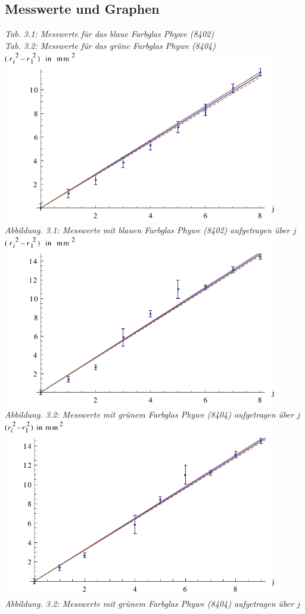 \subsection{Messwerte und Graphen}
\begin{center}

{\it Tab. 3.1: Messwerte für das blaue Farbglas Phywe (8402)}
\vspace{5mm}
\\

{\it Tab. 3.2: Messwerte für das grüne Farbglas Phywe (8404)}
\\
\includegraphics[width=12cm]{graphen/blau}
{\it Abbildung. 3.1: Messwerte mit blauen Farbglas Phywe (8402) aufgetragen über \(j\)}
\\
\includegraphics[width=12cm]{graphen/gruen}
{\it Abbildung. 3.2: Messwerte mit grünem Farbglas Phywe (8404) aufgetragen über \(j\)}
\\
\includegraphics[width=12cm]{graphen/gruen_new}
{\it Abbildung. 3.2: Messwerte mit grünem Farbglas Phywe (8404) aufgetragen über \(j\)}

\end{center}
